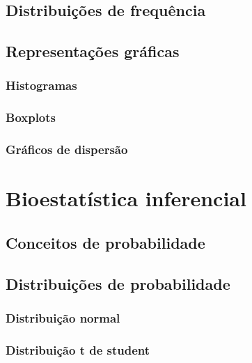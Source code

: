 \documentclass[
]{book}
\begin{document}
\section{Distribuições de frequência}\label{distribuiuxe7uxf5es-de-frequuxeancia}

\section{Representações gráficas}\label{representauxe7uxf5es-gruxe1ficas}

\subsection{Histogramas}\label{histogramas}

\subsection{Boxplots}\label{boxplots}

\subsection{Gráficos de dispersão}\label{gruxe1ficos-de-dispersuxe3o}

\chapter{Bioestatística inferencial}\label{bioestatuxedstica-inferencial}

\section{Conceitos de probabilidade}\label{conceitos-de-probabilidade}

\section{Distribuições de probabilidade}\label{distribuiuxe7uxf5es-de-probabilidade}

\subsection{Distribuição normal}\label{distribuiuxe7uxe3o-normal}

\subsection{Distribuição t de student}\label{distribuiuxe7uxe3o-t-de-student}
\end{document}

